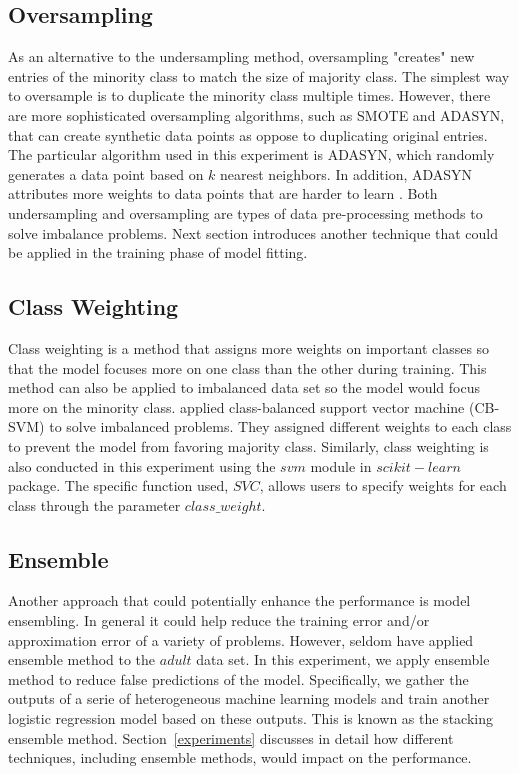 \documentclass{article}
\begin{document}
\subsection{Oversampling}
\label{oversampling}

As an alternative to the undersampling method, oversampling "creates" new entries of the minority class to match the size of majority class. The simplest way to oversample is to duplicate the minority class multiple times. However, there are more sophisticated oversampling algorithms, such as SMOTE and ADASYN, that can create synthetic data points as oppose to duplicating original entries. The particular algorithm used in this experiment is ADASYN, which randomly generates a data point based on $k$ nearest neighbors. In addition, ADASYN attributes more weights to data points that are harder to learn \citep{ADASYN}. Both undersampling and oversampling are types of data pre-processing methods to solve imbalance problems. Next section introduces another technique that could be applied in the training phase of model fitting.

\subsection{Class Weighting}
\label{class_weighting}

Class weighting is a method that assigns more weights on important classes so that the model focuses more on one class than the other during training. This method can also be applied to imbalanced data set so the model would focus more on the minority class. \citet{CBSVM} applied class-balanced support vector machine (CB-SVM) to solve imbalanced problems. They assigned different weights to each class to prevent the model from favoring majority class. Similarly, class weighting is also conducted in this experiment using the $svm$ module in $scikit-learn$ package. The specific function used, $SVC$, allows users to specify weights for each class through the parameter $class\_weight$.

\subsection{Ensemble}
\label{ensemble}

Another approach that could potentially enhance the performance is model ensembling. In general it could help reduce the training error and/or approximation error of a variety of problems. However, seldom have applied ensemble method to the $adult$ data set. In this experiment, we apply ensemble method to reduce false predictions of the model. Specifically, we gather the outputs of a serie of heterogeneous machine learning models and train another logistic regression model based on these outputs. This is known as the stacking ensemble method. Section~\ref{experiments} discusses in detail how different techniques, including ensemble methods, would impact on the performance.
\end{document}
